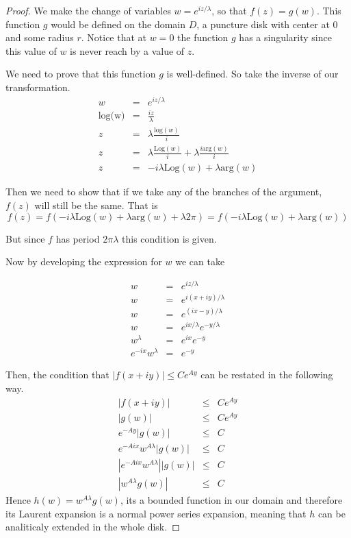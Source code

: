\documentclass[letterpaper,twoside,11pt]{article}
\begin{document}
\begin{proof}
We make the change of variables $w=e^{iz/\lambda}$, so that $f(z)=g(w)$. This function $g$ would be defined on the domain $D$, a puncture disk with center at 0 and some radius $r$. Notice that at $w=0$ the function $g$ has a singularity since this value of $w$ is never reach by a value of $z$. 

We need to prove that this function $g$ is well-defined. So take the inverse of our transformation.
\begin{eqnarray}
w&=&e^{iz/\lambda} \nonumber
\\\text{log(w)}&=&\frac{iz}{\lambda} \nonumber
\\z&=& \lambda \frac{\text{log}(w)}{i}\nonumber
\\z&=& \lambda \frac{\text{Log}(w)}{i}+\lambda \frac{i\text{arg}(w)}{i}\nonumber
\\z&=&  -i\lambda\text{Log}(w)+\lambda \text{arg}(w)\nonumber
\end{eqnarray}

Then we need to show that if we take any of the branches of the argument, $f(z)$ will still be the same. That is 
\begin{equation}
f(z)= f(-i\lambda\text{Log}(w)+\lambda \text{arg}(w)+\lambda 2 \pi)=f(-i\lambda\text{Log}(w)+\lambda \text{arg}(w)) \nonumber
\end{equation}

But since $f$ has period $2 \pi \lambda$ this condition is given.

Now by developing the expression for $w$ we can take

\begin{eqnarray}
w&=&e^{iz/\lambda} \nonumber
\\w&=&e^{i(x+iy)/\lambda} \nonumber
\\w&=&e^{(ix-y)/\lambda} \nonumber
\\w&=&e^{ix/\lambda}e^{-y/\lambda} \nonumber
\\w^{\lambda}&=&e^{ix}e^{-y} \nonumber
\\e^{-ix}w^{\lambda}&=&e^{-y} \nonumber
\end{eqnarray}

Then, the condition that $|f(x + iy)| \leq  Ce^{Ay}$ can be restated in the following way. 
\begin{eqnarray}
|f(x + iy)| &\leq&  Ce^{Ay}\nonumber
\\|g(w)| &\leq&  Ce^{Ay}\nonumber
\\e^{-Ay}|g(w)| &\leq&  C \nonumber
\\e^{-Aix}w^{A\lambda}|g(w)| &\leq&  C \nonumber
\\|e^{-Aix}w^{A\lambda}||g(w)| &\leq&  C \nonumber
\\|w^{A\lambda}g(w)| &\leq&  C \nonumber
\end{eqnarray}
Hence $h(w)=w^{A\lambda}g(w)$, its a bounded function in our domain and therefore its Laurent expansion is a normal power series expansion, meaning that $h$ can be analiticaly extended in the whole disk.


\end{proof}
\end{document}
